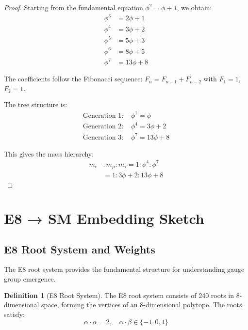 \documentclass[11pt]{article}
\theoremstyle{definition}
\newtheorem{definition}{Definition}[section]
\newcommand{\goldenratio}{\phi}
\begin{document}
\begin{proof}
Starting from the fundamental equation $\goldenratio^2 = \goldenratio + 1$, we obtain:
\begin{align}
\goldenratio^3 &= 2\goldenratio + 1 \\
\goldenratio^4 &= 3\goldenratio + 2 \\
\goldenratio^5 &= 5\goldenratio + 3 \\
\goldenratio^6 &= 8\goldenratio + 5 \\
\goldenratio^7 &= 13\goldenratio + 8
\end{align}

The coefficients follow the Fibonacci sequence: $F_n = F_{n-1} + F_{n-2}$ with $F_1 = 1$, $F_2 = 1$.

The tree structure is:
\begin{align}
\text{Generation 1: } & \goldenratio^1 = \goldenratio \\
\text{Generation 2: } & \goldenratio^4 = 3\goldenratio + 2 \\
\text{Generation 3: } & \goldenratio^7 = 13\goldenratio + 8
\end{align}

This gives the mass hierarchy:
\begin{align}
m_e &: m_\mu : m_\tau = 1 : \goldenratio^4 : \goldenratio^7 \\
&= 1 : 3\goldenratio + 2 : 13\goldenratio + 8
\end{align}
\end{proof}

\section{E8 → SM Embedding Sketch}

\subsection{E8 Root System and Weights}

The E8 root system provides the fundamental structure for understanding gauge group emergence.

\begin{definition}[E8 Root System]
The E8 root system consists of 240 roots in 8-dimensional space, forming the vertices of an 8-dimensional polytope. The roots satisfy:
\begin{equation}
\alpha \cdot \alpha = 2, \quad \alpha \cdot \beta \in \{-1, 0, 1\}
\end{equation}
\end{definition}
\end{document}
